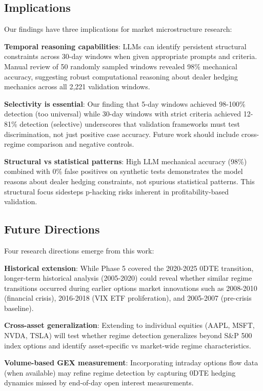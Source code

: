 \subsection{Implications}

Our findings have three implications for market microstructure research:

\textbf{Temporal reasoning capabilities}: LLMs can identify persistent structural constraints across 30-day windows when given appropriate prompts and criteria. Manual review of 50 randomly sampled windows revealed 98\% mechanical accuracy, suggesting robust computational reasoning about dealer hedging mechanics across all 2,221 validation windows.

\textbf{Selectivity is essential}: Our finding that 5-day windows achieved 98-100\% detection (too universal) while 30-day windows with strict criteria achieved 12-81\% detection (selective) underscores that validation frameworks must test discrimination, not just positive case accuracy. Future work should include cross-regime comparison and negative controls.

\textbf{Structural vs statistical patterns}: High LLM mechanical accuracy (98\%) combined with 0\% false positives on synthetic tests demonstrates the model reasons about dealer hedging constraints, not spurious statistical patterns. This structural focus sidesteps p-hacking risks inherent in profitability-based validation.

\subsection{Future Directions}

Four research directions emerge from this work:

\textbf{Historical extension}: While Phase 5 covered the 2020-2025 0DTE transition, longer-term historical analysis (2005-2020) could reveal whether similar regime transitions occurred during earlier options market innovations such as 2008-2010 (financial crisis), 2016-2018 (VIX ETF proliferation), and 2005-2007 (pre-crisis baseline).

\textbf{Cross-asset generalization}: Extending to individual equities (AAPL, MSFT, NVDA, TSLA) will test whether regime detection generalizes beyond S\&P 500 index options and identify asset-specific vs market-wide regime characteristics.

\textbf{Volume-based GEX measurement}: Incorporating intraday options flow data (when available) may refine regime detection by capturing 0DTE hedging dynamics missed by end-of-day open interest measurements.

